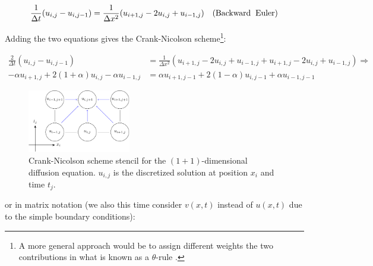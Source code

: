 \documentclass[a4paper, 11pt, notitlepage,english]{article}
\begin{document}
\begin{equation}
 \frac{1}{\Delta t} (u_{i,j}-u_{i,j-1}) = \frac{1}{\Delta x^2} (u_{i+1,j}-2u_{i,j}+u_{i-1,j}) \hspace{10pt} \mathrm{(Backward \hspace{2mm} Euler)}
\end{equation}

Adding the two equations gives the Crank-Nicolson scheme\footnote{A more general approach would be to assign different weights the two contributions in what is known as a $\theta$-rule \cite{Komp3150}.}:

\begin{align}
\frac{2}{\Delta t} (u_{i,j}-u_{i,j-1}) &= \frac{1}{\Delta x^2} (u_{i+1,j}-2u_{i,j}+u_{i-1,j}+u_{i+1,j}-2u_{i,j}+u_{i-1,j} ) \Rightarrow \\
 -\alpha u_{i+1,j} + 2(1+\alpha)u_{i,j} -\alpha u_{i-1,j} &= \alpha u_{i+1,j-1} + 2(1-\alpha) u_{i,j-1} + \alpha u_{i-1,j-1}
\label{eq:Crank_Nicoloson_scheme}
\end{align}

\begin{figure}[h!tb]
 \centering
 \includegraphics[width=0.4\textwidth]{Grid_CN-figure0}
 \caption{Crank-Nicolson scheme stencil for the $(1+1)$-dimensional diffusion equation. $u_{i,j}$ is the discretized solution at position $x_i$ and time $t_j$.}
 \label{fig:CN_grid}
\end{figure}

or in matrix notation (we also this time consider $v(x,t)$ instead of $u(x,t)$ due to the simple boundary conditions):
\end{document}
